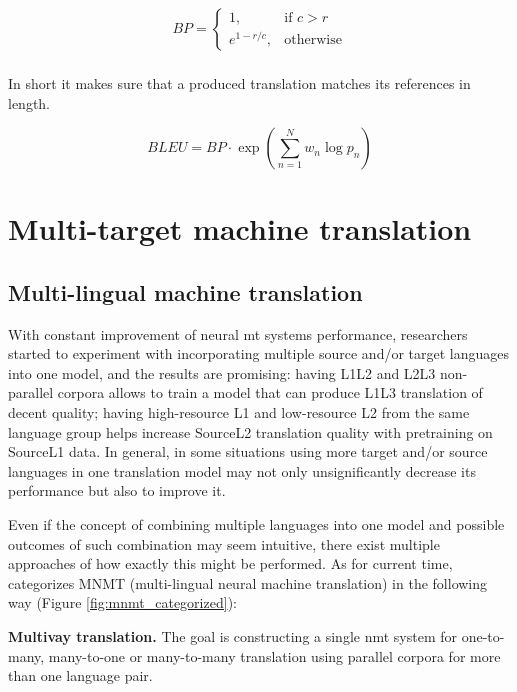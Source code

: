\[
	    BP=
	    \begin{cases}
		        1,           & \text{if } c > r\\
			e^{1-r/c}, & \text{otherwise}
	    \end{cases}
\]

\subsubsection*{}

In short it makes sure that a produced translation matches its
references in length.

\[
	BLEU=BP \cdot \exp \left(\sum_{n=1}^{N} w_n \log p_n \right)
\]

\section{Multi-target machine translation}
\label{section:multitarget_mt}

\subsection{Multi-lingual machine translation}

With constant improvement of neural \acrshort{mt} systems performance,
researchers started to experiment with incorporating multiple source
and/or target languages into one model,
and the results are promising: having L1\to{}L2 and L2\to{}L3 non-parallel
corpora allows to train a model that can produce L1\to{}L3 translation
of decent quality; having high-resource L1 and low-resource L2
from the same language
group helps increase Source\to{}L2 translation quality with pretraining on
Source\to{}L1 data.
In general, in some situations using more target and/or source languages in one translation
model may not only unsignificantly decrease its performance but also to improve it.

Even if the concept of combining multiple languages into one model and possible outcomes
of such combination may seem intuitive, there exist multiple approaches of how exactly
this might be performed. As for current time, \cite{Dabre2019} categorizes
MNMT (multi-lingual neural machine translation) in the following way
(Figure \ref{fig:mnmt_categorized}):

\textbf{Multivay translation.}
The goal is constructing a single \acrshort{nmt} system for
one-to-many, many-to-one or many-to-many
translation using parallel corpora for more than one language pair.

